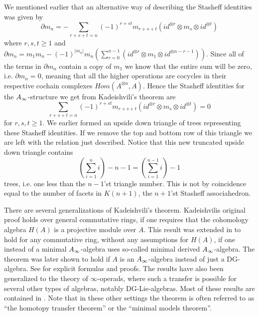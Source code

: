 We mentioned earlier that an alternative way of describing the Stasheff identities was given by 
\begin{equation*}
    \partial m_n = - \sum_{r+s+t=n}(-1)^{r+st}m_{r+s+t}(id^{\otimes r}\otimes m_s\otimes id^{\otimes t})
\end{equation*}
where $r,s,t\geq 1$ and $\partial m_n = m_1m_n - (-1)^{|m_n|}m_n(\sum_{r=0}^{n-1}(id^{\otimes r}\otimes m_1\otimes id^{\otimes n-r-1}))$. Since all of the terms in $\partial m_n$ contain a copy of $m_1$ we know that the entire sum will be zero, i.e. $\partial m_n = 0$, meaning that all the higher operations are cocycles in their respective cochain complexes $Hom(A^{\otimes n}, A)$. Hence the Stasheff identities for the $A_{\infty}$-structure we get from Kadeishvili's theorem are
\begin{equation*}
    \sum_{r+s+t=n}(-1)^{r+st}m_{r+s+t}(id^{\otimes r}\otimes m_s\otimes id^{\otimes t}) = 0
\end{equation*}
for $r, s, t\geq 1$. We earlier formed an upside down triangle of trees representing these Stasheff identities. If we remove the top and bottom row of this triangle we are left with the relation just described. Notice that this new truncated upside down triangle contains 
\begin{equation*}
    (\sum_{i=1}^n i) - n-1 = (\sum_{i=1}^{n-1} i) -1
\end{equation*}
trees, i.e. one less than the $n-1$'st triangle number. This is not by coincidence equal to the number of facets in $K(n+1)$, the $n+1$'st Stasheff associahedron. 



\begin{remark}
There are several generalizations of Kadeishvili's theorem. Kadeishvilis original proof holds over general commutative rings, if one requires that the cohomology algebra $H(A)$ is a projective module over $A$. This result was extended in \cite{Sagave} to hold for any commutative ring, without any assumptions for $H(A)$, if one instead of a minimal $A_{\infty}$-algebra uses so-called minimal derived $A_{\infty}$-algebra. The theorem was later shown to hold if $A$ is an $A_{\infty}$-algebra instead of just a DG-algebra. See \cite{transfer} for explicit formulas and proofs. The results have also been generalized to the theory of $\infty$-operads, where such a transfer is possible for several other types of algebras, notably DG-Lie-algebras. Most of these results are contained in \cite{operads}. Note that in these other settings the theorem is often referred to as ``the homotopy transfer theorem'' or the ``minimal models theorem''. 
\end{remark}






